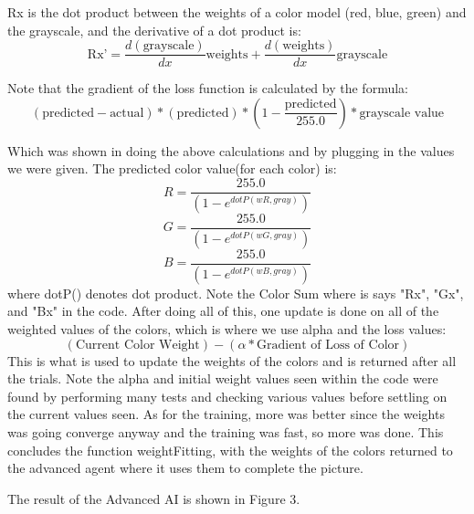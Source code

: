 \documentclass[11pt]{article}
\begin{document}
Rx is the dot product between the weights of a color model (red, blue, green) and the grayscale, and the derivative of a dot product is:
\[
\text{Rx'} = \frac{d(\text{grayscale})}{dx}\text{weights} + \frac{d(\text{weights})}{dx}\text{grayscale}
\]

Note that the gradient of the loss function is calculated by the formula:
\[
(\text{predicted} - \text{actual})*(\text{predicted})*(1 - \frac{\text{predicted}}{255.0}) * \text{grayscale value}
\]

Which was shown in doing the above calculations and by plugging in the values we were given. The predicted color value(for each color) is:
\[
R = \frac{255.0}{(1 - e^{dotP(wR, gray)})}
\]
\[
G = \frac{255.0}{(1 - e^{dotP(wG, gray)})}
\]
\[
B = \frac{255.0}{(1 - e^{dotP(wB, gray)})}
\]
where dotP() denotes dot product.
Note the Color Sum where is says "Rx", "Gx", and "Bx" in the code. After doing all of this, one update is done on all of the weighted values of the colors, which is where we use alpha and the loss values:
\[
(\text{Current Color Weight}) - (\alpha * \text{Gradient of Loss of Color})
\]
This is what is used to update the weights of the colors and is returned after all the trials. Note the alpha and initial weight values seen within the code were found by performing many tests and checking various values before settling on the current values seen. As for the training, more was better since the weights was going converge anyway and the training was fast, so more was done. This concludes the function weightFitting, with the weights of the colors returned to the advanced agent where it uses them to complete the picture.

The result of the Advanced AI is shown in Figure 3.
\end{document}
